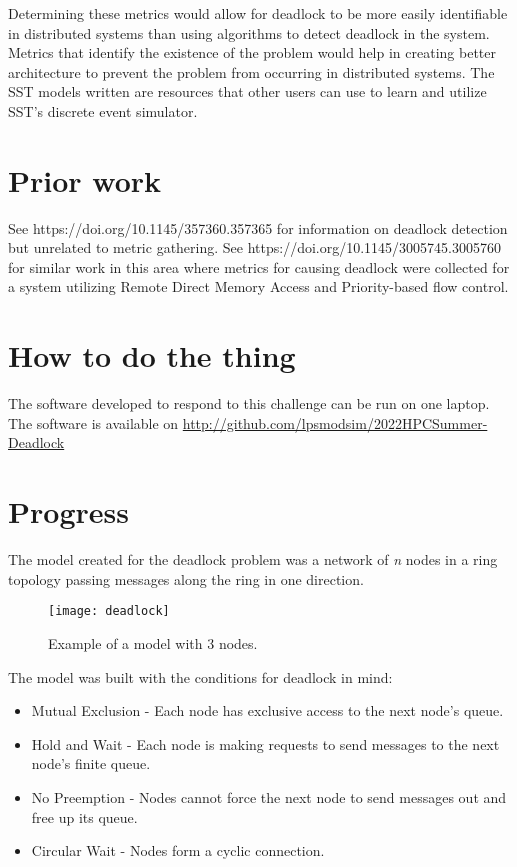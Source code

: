 \documentclass{article}
\begin{document}
Determining these metrics would allow for deadlock to be more easily identifiable in distributed systems than using algorithms to detect deadlock in the system. Metrics that identify the existence of the problem would help in creating better architecture to prevent the problem from occurring in distributed systems. The SST models written are resources that other users can use to learn and utilize SST's discrete event simulator.

\section{Prior work} %

See https://doi.org/10.1145/357360.357365 for information on deadlock detection but unrelated to metric gathering.
See https://doi.org/10.1145/3005745.3005760 for similar work in this area where metrics for causing deadlock were collected for a system utilizing Remote Direct Memory Access and Priority-based flow control.

\section{How to do the thing}

The software developed to respond to this challenge can be run on one laptop.
The software is available on \href{http://github.com/lpsmodsim/2022HPCSummer-Deadlock}{http://github.com/lpsmodsim/2022HPCSummer-Deadlock}

\section{Progress}
The model created for the deadlock problem was a network of \textit{n} nodes in a ring topology passing messages along the ring in one direction.

\begin{figure}[H]
\texttt{[image: deadlock]}\newline
\centering
\caption{Example of a model with 3 nodes.}
\centering
\end{figure}

The model was built with the conditions for deadlock in mind:

\begin{itemize}
	\item Mutual Exclusion - Each node has exclusive access to the next node's queue.
	\item Hold and Wait - Each node is making requests to send messages to the next node's finite queue.
	\item No Preemption - Nodes cannot force the next node to send messages out and free up its queue.
	\item Circular Wait - Nodes form a cyclic connection.\newline
\end{itemize}
\end{document}
